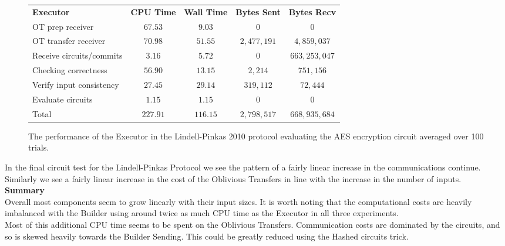 \documentclass[ %
                    author={Nicholas Tutte},
                supervisor={Prof. Nigel Smart},
                    degree={MEng},
                     title={Secure Two Party Computation},
                  subtitle={A practical comparison of recent protocols},
                      type={Research - GG1K},
                      year={2015} ]{dissertation}
\begin{document}
				\begin{figure}[!ht]
					\begin{tabular}{| p{4.3cm} | c c c c |}
						\hline
						\textbf{Executor} & \textbf{CPU Time} & \textbf{Wall Time} & \textbf{Bytes Sent} & \textbf{Bytes Recv} \\
						\thickhline
						OT prep receiver & $67.53$ & $9.03$ & $0$ & $0$ \\
						\hline
						OT transfer receiver & $70.98$ & $51.55$ & $2,477,191$ & $4,859,037$ \\
						\hline
						Receive circuits/commits & $3.16$ & $5.72$ & $0$ & $663,253,047$ \\
						\hline
						Checking correctness & $56.90$ & $13.15$ & $2,214$ & $751,156$ \\
						\hline
						Verify input consistency & $27.45$ & $29.14$ & $319,112$ & $72,444$ \\
						\hline
						Evaluate circuits & $1.15$ & $1.15$ & $0$ & $0$ \\
						\thickhline
						Total & $227.91$ & $116.15$ & $2,798,517$ & $668,935,684$ \\
						\hline
					\end{tabular}
					\caption{The performance of the Executor in the Lindell-Pinkas 2010 protocol evaluating the AES encryption circuit averaged over 100 trials. \label{table:LP_2010_AES_Executor}}
				\end{figure}
				\FloatBarrier

				In the final circuit test for the Lindell-Pinkas Protocol we see the pattern of a fairly linear increase in the communications continue. Similarly we see a fairly linear increase in the cost of the Oblivious Transfers in line with the increase in the number of inputs.\\

			\noindent\textbf{Summary}\\

				Overall most components seem to grow linearly with their input sizes. It is worth noting that the computational costs are heavily imbalanced with the Builder  using around twice as much CPU time as the Executor in all three experiments.\\

				Most of this additional CPU time seems to be spent on the Oblivious Transfers. Communication costs are dominated by the circuits, and so is skewed heavily towards the Builder Sending. This could be greatly reduced using the Hashed circuits trick.\\
\end{document}
